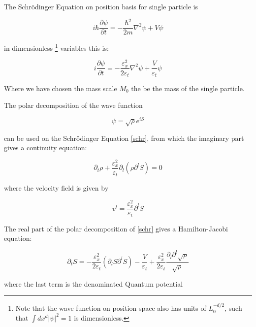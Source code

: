\documentclass[a4paper,12pt]{article}
\begin{document}
The Schr\"odinger Equation on position basis for single particle is

\begin{equation}\label{schr_dim}
i \hbar \frac{\partial \psi}{\partial t} = - \frac{\hbar^2}{2m}\nabla^2 \psi + V \psi
\end{equation}

in dimensionless \footnote{Note that the wave function on position space also has units of $L_0^{-d/2}$, such that $\int dx^d |\psi|^2 = 1$ is dimensionless.} variables this is:

\begin{equation}\label{schr}
i  \frac{\partial \psi}{\partial t} = - \frac{\varepsilon_x^2}{2 \varepsilon_t} \nabla^2 \psi + \frac{V}{\varepsilon_t} \psi
\end{equation}

Where we have chosen the mass scale $M_0$ the be the mass of the single particle.

The polar decomposition of the wave function

\begin{equation}\label{psi_polar}
\psi = \sqrt{\rho} e^{iS}
\end{equation}



can be used on the Schr\"odinger Equation \ref{schr}, from which the imaginary part gives a continuity equation:

\begin{equation}\label{cont_schr}
\partial_t \rho + \frac{\varepsilon_x^2}{\varepsilon_t} \partial_l \left( \rho \partial^l S \right) = 0
\end{equation}

where the velocity field is given by 

\begin{equation}\label{real_vel_field}
v^l = \frac{\varepsilon_x^2}{\varepsilon_t} \partial^l S
\end{equation}

The real part of the polar decomposition of \ref{schr} gives a Hamilton-Jacobi equation:

\begin{equation}\label{hj_schr}
\partial_t S =   -\frac{\varepsilon_x^2}{2 \varepsilon_t} ( \partial_l S \partial^l S) - \frac{V}{\varepsilon_t} + \frac{\varepsilon_x^2}{2 \varepsilon_t} \frac{\partial_l \partial^l \sqrt{\rho}}{\sqrt{\rho}}
\end{equation}

where the last term is the denominated Quantum potential
\end{document}
